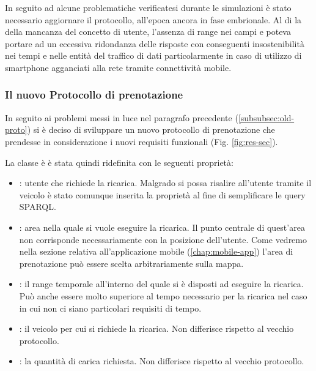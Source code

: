 \noindent
In seguito ad alcune problematiche verificatesi durante le simulazioni è stato necessario aggiornare il protocollo, all'epoca ancora in fase embrionale.
Al di la della mancanza del concetto di utente, l'assenza di range nei campi  e  poteva portare ad un eccessiva ridondanza delle risposte con conseguenti insostenibilità nei tempi e nelle entità del traffico di dati particolarmente in caso di utilizzo di smartphone agganciati alla rete tramite connettività mobile.

\subsubsection{Il nuovo Protocollo di prenotazione}\label{subsubsec:chargerequest}

In seguito ai problemi messi in luce nel paragrafo precedente (\ref{subsubsec:old-proto}) si è deciso di sviluppare un nuovo protocollo di prenotazione che prendesse in considerazione i nuovi requisiti funzionali (Fig. \ref{fig:res-sec}).

La classe è  è stata quindi ridefinita con le seguenti proprietà:

\begin{itemize}
	\item {}: utente che richiede la ricarica. Malgrado si possa risalire all'utente tramite il veicolo è stato comunque inserita la proprietà al fine di semplificare le query SPARQL.
	\item {}: area nella quale si vuole eseguire la ricarica. Il punto centrale di quest'area non corrisponde necessariamente con la posizione dell'utente. Come vedremo nella sezione relativa all'applicazione mobile (\ref{chap:mobile-app}) l'area di prenotazione può essere scelta arbitrariamente sulla mappa.
	\item {}: il range temporale all'interno del quale si è disposti ad eseguire la ricarica. Può anche essere molto superiore al tempo necessario per la ricarica nel caso in cui non ci siano particolari requisiti di tempo.
	\item {}: il veicolo per cui si richiede la ricarica. Non differisce rispetto al vecchio protocollo.
	\item {}: la quantità di carica richiesta. Non differisce rispetto al vecchio protocollo.
\end{itemize}

